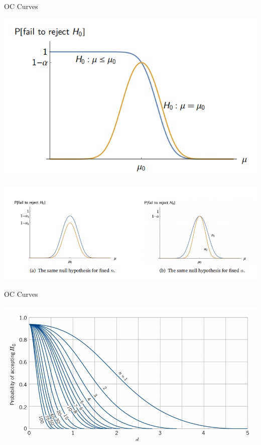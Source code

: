 \documentclass{beamer}
\begin{document}
\begin{frame}{OC Curves}
\begin{center}
\includegraphics[scale=0.3]{3.png}
\end{center}
\begin{center}
\includegraphics[scale=0.45]{4.png}
\end{center}
\end{frame}

\begin{frame}{OC Curves}
\begin{center}
\includegraphics[scale=0.45]{5.png}
\end{center}
\end{frame}
\end{document}
